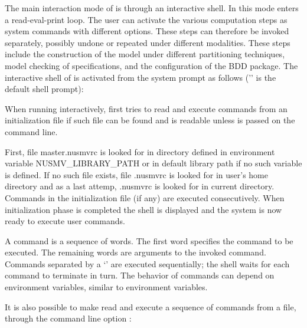 
The main interaction mode of \nusmv is through an interactive shell.
In this mode \nusmv enters a read-eval-print loop. The user can
activate the various \nusmv computation steps as system commands with
different options. These steps can therefore be invoked separately,
possibly undone or repeated under different modalities. These steps
include the construction of the model under different partitioning
techniques, model checking of specifications, and the configuration of
the BDD package. The interactive shell of \nusmv is activated from the
system prompt as follows ('\nusmvprompt' is the default \nusmv
shell prompt):

\begin{alltt}
\shellprompt {} \ret
\nusmvprompt
\end{alltt}

When running interactively, \nusmv first tries to read and execute
commands from an initialization file if such file can be found and is
readable unless  is passed on the command line. 

First, file master.nusmvrc is looked for in directory defined in
environment variable NUSMV\_LIBRARY\_PATH or in default library path
if no such variable is defined. If no such file exists, file .nusmvrc
is looked for in user's home directory and as a last attemp, .nusmvrc
is looked for in current directory. Commands in the initialization
file (if any) are executed consecutively. When initialization phase is
completed the \nusmv shell is displayed and the system is now ready to
execute user commands.

A \nusmv command is a sequence of words. The first word specifies the
command to be executed. The remaining words are arguments to the
invoked command. Commands separated by a `\code{;}' are executed
sequentially; the \nusmv shell waits for each command to terminate in
turn. The behavior of commands can depend on environment variables,
similar to \csh environment variables.

It is also possible to make \nusmv read and execute a sequence of
commands from a file, through the command line option 
:

\begin{alltt}
\shellprompt {} \ret
\end{alltt}

\begin{nusmvTable}

\end{nusmvTable}

